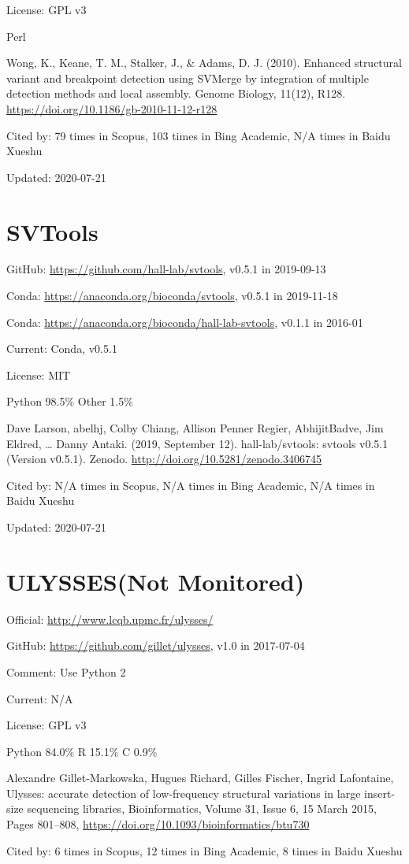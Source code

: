 \documentclass[]{article}
\newcommand{\nm}{{\color{red}(Not Monitored)}}
\newcommand{\cb}[3]{\par Cited by: {\color{blue}\Huge #1} times in Scopus, {\color{blue}\Huge #2} times in Bing Academic, {\color{blue}\Huge #3} times in Baidu Xueshu}
\begin{document}
License: GPL v3

Perl

Wong, K., Keane, T. M., Stalker, J., \& Adams, D. J. (2010). Enhanced structural variant and breakpoint detection using SVMerge by integration of multiple detection methods and local assembly. Genome Biology, 11(12), R128. \url{https://doi.org/10.1186/gb-2010-11-12-r128}\cb{79}{103}{N/A}

Updated: 2020-07-21

\section{SVTools}

GitHub: \url{https://github.com/hall-lab/svtools}, v0.5.1 in 2019-09-13

Conda: \url{https://anaconda.org/bioconda/svtools}, v0.5.1 in 2019-11-18

Conda: \url{https://anaconda.org/bioconda/hall-lab-svtools}, v0.1.1 in 2016-01

Current: Conda, v0.5.1

License: MIT

Python 98.5\% Other 1.5\%

Dave Larson, abelhj, Colby Chiang, Allison Penner Regier, AbhijitBadve, Jim Eldred, … Danny Antaki. (2019, September 12). hall-lab/svtools: svtools v0.5.1 (Version v0.5.1). Zenodo. \url{http://doi.org/10.5281/zenodo.3406745}\cb{N/A}{N/A}{N/A}

Updated: 2020-07-21

\section{ULYSSES\nm}

Official: \url{http://www.lcqb.upmc.fr/ulysses/}

GitHub: \url{https://github.com/gillet/ulysses}, v1.0 in 2017-07-04

Comment: Use Python 2

Current: N/A

License: GPL v3

Python 84.0\% R 15.1\% C 0.9\%

Alexandre Gillet-Markowska, Hugues Richard, Gilles Fischer, Ingrid Lafontaine, Ulysses: accurate detection of low-frequency structural variations in large insert-size sequencing libraries, Bioinformatics, Volume 31, Issue 6, 15 March 2015, Pages 801–808, \url{https://doi.org/10.1093/bioinformatics/btu730}\cb{6}{12}{8}
\end{document}

